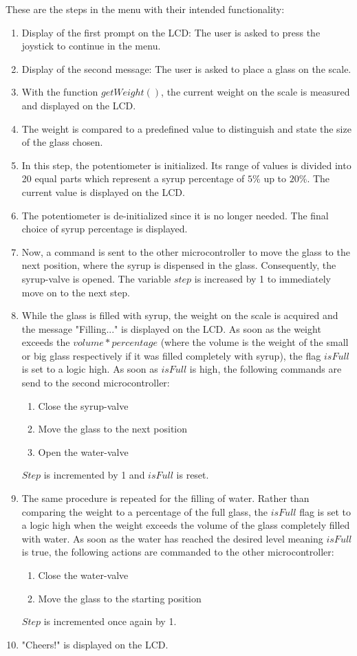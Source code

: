 \documentclass[twocolumn]{article}
\begin{document}
	These are the steps in the menu with their intended functionality:
	
	\begin{enumerate}
		\item Display of the first prompt on the LCD: The user is asked to press the joystick to continue in the menu.
		\item Display of the second message: The user is asked to place a glass on the scale.
		\item With the function $getWeight()$, the current weight on the scale is measured and displayed on the LCD.
		\item The weight is compared to a predefined value to distinguish and state the size of the glass chosen.
		\item In this step, the potentiometer is initialized. Its range of values is divided into 20 equal parts which represent a syrup percentage of $5\%$ up to $20\%$. The current value is displayed on the LCD.
		\item The potentiometer is de-initialized since it is no longer needed. The final choice of syrup percentage is displayed.
		\item Now, a command is sent to the other microcontroller to move the glass to the next position, where the syrup is dispensed in the glass. Consequently, the syrup-valve is opened. The variable $step$ is increased by 1 to immediately move on to the next step.
		\item While the glass is filled with syrup, the weight on the scale is acquired and the message "Filling..." is displayed on the LCD. As soon as the weight exceeds the $volume*percentage$ (where the volume is the weight of the small or big glass respectively if it was filled completely with syrup), the flag $isFull$ is set to a logic high. 
		As soon as $isFull$ is high, the following commands are send to the second microcontroller: 
				
		\newpage
		\vspace*{40px}
		
		\begin{enumerate}
			\item Close the syrup-valve
			\item Move the glass to the next position
			\item Open the water-valve
		\end{enumerate}
		$Step$ is incremented by 1 and $isFull$ is reset.
		\item The same procedure is repeated for the filling of water. Rather than comparing the weight to a percentage of the full glass, the $isFull$ flag is set to a logic high when the weight exceeds the volume of the glass completely filled with water. As soon as the water has reached the desired level meaning $isFull$ is true, the following actions are commanded to the other microcontroller:
		\begin{enumerate}
			\item Close the water-valve
			\item Move the glass to the starting position
		\end{enumerate}
		$Step$ is incremented once again by 1.
		\item "Cheers!" is displayed on the LCD.


\end{enumerate}
\end{document}

